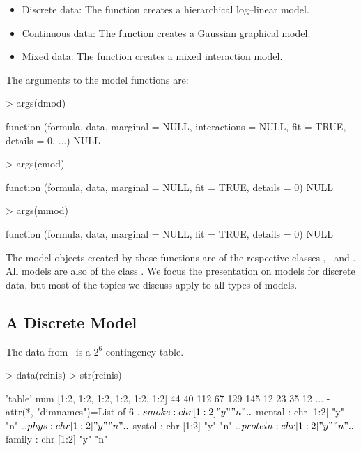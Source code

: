 \documentclass[12pt]{article}
\begin{document}
\begin{itemize}
\item Discrete data: The  function creates a hierarchical
  log--linear model.
\item Continuous data: The  function creates a Gaussian
  graphical model.
\item Mixed data: The  function creates a mixed
  interaction model.
\end{itemize}

The arguments to the model functions are:

\begin{Schunk}
\begin{Sinput}
> args(dmod)
\end{Sinput}
\begin{Soutput}
function (formula, data, marginal = NULL, interactions = NULL, 
    fit = TRUE, details = 0, ...) 
NULL
\end{Soutput}
\begin{Sinput}
> args(cmod)
\end{Sinput}
\begin{Soutput}
function (formula, data, marginal = NULL, fit = TRUE, details = 0) 
NULL
\end{Soutput}
\begin{Sinput}
> args(mmod)
\end{Sinput}
\begin{Soutput}
function (formula, data, marginal = NULL, fit = TRUE, details = 0) 
NULL
\end{Soutput}
\end{Schunk}


The model objects created by these functions are of the respective
classes \dmodo, \cmodo\ and \mmodo. All models are also of the class
\imodo.  We focus the presentation on models for discrete data, but
most of the topics we discuss apply to all types of models.



\subsection{A Discrete Model}
\label{sec:xxx}


The  data from \grbase\ is a $2^6$ contingency table.

\begin{Schunk}
\begin{Sinput}
> data(reinis)
> str(reinis)
\end{Sinput}
\begin{Soutput}
 'table' num [1:2, 1:2, 1:2, 1:2, 1:2, 1:2] 44 40 112 67 129 145 12 23 35 12 ...
 - attr(*, "dimnames")=List of 6
  ..$ smoke  : chr [1:2] "y" "n"
  ..$ mental : chr [1:2] "y" "n"
  ..$ phys   : chr [1:2] "y" "n"
  ..$ systol : chr [1:2] "y" "n"
  ..$ protein: chr [1:2] "y" "n"
  ..$ family : chr [1:2] "y" "n"
\end{Soutput}
\end{Schunk}
\end{document}
